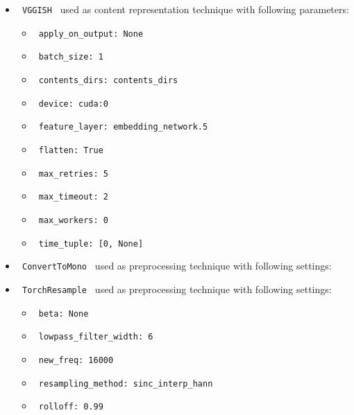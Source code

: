 \documentclass[11pt]{article}
\begin{document}
\begin{itemize}
                                                            
            \item
        \verb| VGGISH | used as content representation technique with following parameters:
        \begin{itemize}
                            \item
                \verb| apply_on_output: None|
                            \item
                \verb| batch_size: 1|
                            \item
                \verb| contents_dirs: contents_dirs|
                            \item
                \verb| device: cuda:0|
                            \item
                \verb| feature_layer: embedding_network.5|
                            \item
                \verb| flatten: True|
                            \item
                \verb| max_retries: 5|
                            \item
                \verb| max_timeout: 2|
                            \item
                \verb| max_workers: 0|
                            \item
                \verb| time_tuple: [0, None]|
                    \end{itemize}
    \end{itemize}
\hfill\break
\hfill\break



\begin{itemize}
    \item
     \verb| ConvertToMono | used as preprocessing technique with following settings:
     \begin{itemize}
           \end{itemize}
    \item
     \verb| TorchResample | used as preprocessing technique with following settings:
     \begin{itemize}
             \item
            \verb| beta: None|
             \item
            \verb| lowpass_filter_width: 6|
             \item
            \verb| new_freq: 16000|
             \item
            \verb| resampling_method: sinc_interp_hann|
             \item
            \verb| rolloff: 0.99|
           \end{itemize}
\end{itemize}
\hfill\break
\hfill\break
\end{document}
